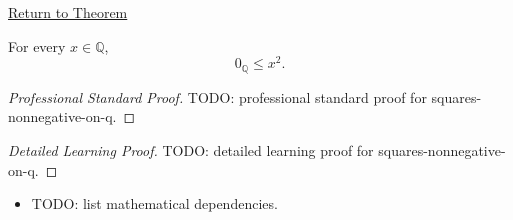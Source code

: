 \newpage
{}
\label{prf:squares-nonnegative-on-q}

\begin{remark*}[Return]
\hyperref[cor:squares-nonnegative-on-q]{Return to Theorem}
\end{remark*}

\begin{corollary*}
For every $x\in\mathbb{Q}$,
\[
0_{\mathbb{Q}}\le x^2.
\]
\end{corollary*}

\begin{proof}[Professional Standard Proof]
\LRAProofBodyStart
TODO: professional standard proof for squares-nonnegative-on-q.
\end{proof}

\begin{proof}[Detailed Learning Proof]
\LRAProofBodyStart
TODO: detailed learning proof for squares-nonnegative-on-q.
\end{proof}

\begin{remark*}
\end{remark*}

\begin{dependencies}
\begin{itemize}
  \item TODO: list mathematical dependencies.
\end{itemize}
\end{dependencies}

\clearpage
